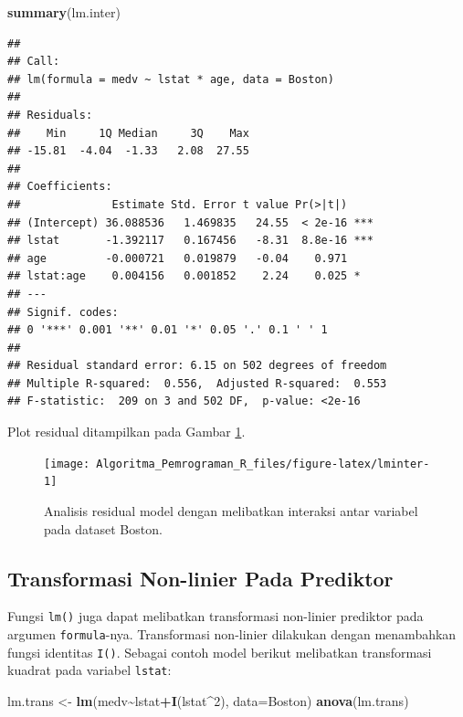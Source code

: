 \documentclass[
]{book}
\newenvironment{Shaded}{\begin{snugshade}}{\end{snugshade}}
\newcommand{\AttributeTok}[1]{\textcolor[rgb]{0.13,0.29,0.53}{#1}}
\newcommand{\DecValTok}[1]{\textcolor[rgb]{0.00,0.00,0.81}{#1}}
\newcommand{\FunctionTok}[1]{\textcolor[rgb]{0.13,0.29,0.53}{\textbf{#1}}}
\newcommand{\NormalTok}[1]{#1}
\newcommand{\OtherTok}[1]{\textcolor[rgb]{0.56,0.35,0.01}{#1}}
\newcommand{\SpecialCharTok}[1]{\textcolor[rgb]{0.81,0.36,0.00}{\textbf{#1}}}
\theoremstyle{definition}
\theoremstyle{definition}
\theoremstyle{definition}
\theoremstyle{definition}
\theoremstyle{remark}
\begin{document}
\begin{Shaded}
\begin{Highlighting}[]
\FunctionTok{summary}\NormalTok{(lm.inter)}
\end{Highlighting}
\end{Shaded}

\begin{verbatim}
## 
## Call:
## lm(formula = medv ~ lstat * age, data = Boston)
## 
## Residuals:
##    Min     1Q Median     3Q    Max 
## -15.81  -4.04  -1.33   2.08  27.55 
## 
## Coefficients:
##              Estimate Std. Error t value Pr(>|t|)    
## (Intercept) 36.088536   1.469835   24.55  < 2e-16 ***
## lstat       -1.392117   0.167456   -8.31  8.8e-16 ***
## age         -0.000721   0.019879   -0.04    0.971    
## lstat:age    0.004156   0.001852    2.24    0.025 *  
## ---
## Signif. codes:  
## 0 '***' 0.001 '**' 0.01 '*' 0.05 '.' 0.1 ' ' 1
## 
## Residual standard error: 6.15 on 502 degrees of freedom
## Multiple R-squared:  0.556,  Adjusted R-squared:  0.553 
## F-statistic:  209 on 3 and 502 DF,  p-value: <2e-16
\end{verbatim}

Plot residual ditampilkan pada Gambar \ref{fig:lminter}.

\begin{figure}

{\centering \texttt{[image: Algoritma\_Pemrograman\_R\_files/figure-latex/lminter-1]} 

}

\caption{Analisis residual model dengan melibatkan interaksi antar variabel pada dataset Boston.}\label{fig:lminter}
\end{figure}

\hypertarget{nlinpred}{%
\subsection{Transformasi Non-linier Pada Prediktor}\label{nlinpred}}

Fungsi \texttt{lm()} juga dapat melibatkan transformasi non-linier prediktor pada argumen \texttt{formula}-nya. Transformasi non-linier dilakukan dengan menambahkan fungsi identitas \texttt{I()}. Sebagai contoh model berikut melibatkan transformasi kuadrat pada variabel \texttt{lstat}:

\begin{Shaded}
\begin{Highlighting}[]
\NormalTok{lm.trans }\OtherTok{\textless{}{-}} \FunctionTok{lm}\NormalTok{(medv}\SpecialCharTok{\textasciitilde{}}\NormalTok{lstat}\SpecialCharTok{+}\FunctionTok{I}\NormalTok{(lstat}\SpecialCharTok{\^{}}\DecValTok{2}\NormalTok{), }\AttributeTok{data=}\NormalTok{Boston)}
\FunctionTok{anova}\NormalTok{(lm.trans)}
\end{Highlighting}
\end{Shaded}
\end{document}
